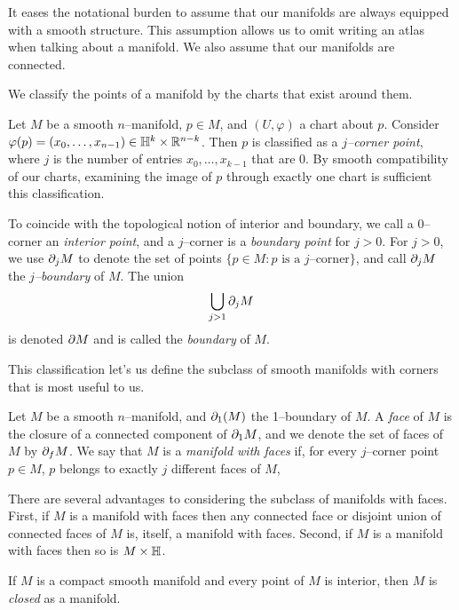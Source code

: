 It eases the notational burden to assume that our manifolds are always equipped with a smooth structure.
This assumption allows us to omit writing an atlas when talking about a manifold.
We also assume that our manifolds are connected.

We classify the points of a manifold by the charts that exist around them.

\begin{defn}
	Let $M$ be a smooth $n$--manifold, $p\in M$, and $(U,\varphi)$ a chart about $p$.
	Consider $\varphi(p)=(x_0,\dots,x_{n-1})\in \mathbb{H}^k\times\mathbb{R}^{n-k}$.
	Then $p$ is classified as a \emph{$j$--corner point}, where $j$ is the number of entries $x_0,\dots,x_{k-1}$ that are 0.
	By smooth compatibility of our charts, examining the image of $p$ through exactly one chart is sufficient this classification.
	
	To coincide with the topological notion of interior and boundary, we call a $0$--corner an \emph{interior point}, and a $j$--corner is a \emph{boundary point} for $j>0$.
	For $j>0$, we use $\partial_j M$ to denote the set of points $\{p\in M:p\textrm{ is a }j\textrm{--corner}\}$, and call $\partial_j M$ the \emph{$j$--boundary} of $M$.
	The union $$\bigcup_{j>1} \partial_j M$$ is denoted $\partial M$ and is called the \emph{boundary} of $M$.
\end{defn}	

This classification let's us define the subclass of smooth manifolds with corners that is most useful to us.

\begin{defn}
	Let $M$ be a smooth $n$--manifold, and $\partial_1(M)$ the 1--boundary of $M$.
	A \emph{face} of $M$ is the closure of a connected component of $\partial_1 M$, and we denote the set of faces of $M$ by $\partial_f M$.
	We say that $M$ is a \emph{manifold with faces} if, for every $j$--corner point $p\in M$, $p$ belongs to exactly $j$ different faces of $M$,
\end{defn}

There are several advantages to considering the subclass of manifolds with faces.
First, if $M$ is a manifold with faces then any connected face or disjoint union of connected faces of $M$ is, itself, a manifold with faces.
Second, if $M$ is a manifold with faces then so is $M\times \mathbb{H}$.
	
\begin{defn}
	If $M$ is a compact smooth manifold and every point of $M$ is interior, then $M$ is \emph{closed} as a manifold.
\end{defn}

